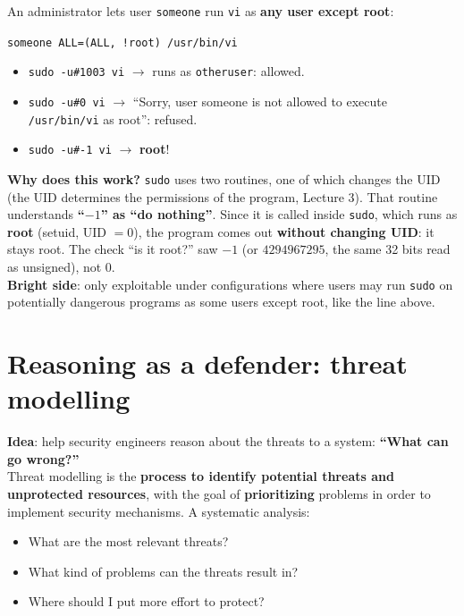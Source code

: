 \begin{exbox}[title={The \texttt{sudo} bug (CVE-2019-14287)}]
An administrator lets user \texttt{someone} run \texttt{vi} as \textbf{any user except root}:
\begin{center}
\texttt{someone ALL=(ALL, !root) /usr/bin/vi}
\end{center}
\begin{itemize}
  \item \texttt{sudo -u\#1003 vi} $\to$ runs as \texttt{otheruser}: allowed.
  \item \texttt{sudo -u\#0 vi} $\to$ ``Sorry, user someone is not allowed to execute
        \texttt{/usr/bin/vi} as root'': refused.
  \item \texttt{sudo -u\#-1 vi} $\to$ \textbf{root}!
\end{itemize}
\textbf{Why does this work?} \texttt{sudo} uses two routines, one of which changes the UID (the
UID determines the permissions of the program, Lecture 3). That routine understands
\textbf{``$-1$'' as ``do nothing''}. Since it is called inside \texttt{sudo}, which runs as
\textbf{root} (setuid, UID $= 0$), the program comes out \textbf{without changing UID}: it stays
root. The check ``is it root?'' saw $-1$ (or $4294967295$, the same 32 bits read as unsigned), not
$0$. \\
\textbf{Bright side}: only exploitable under configurations where users may run \texttt{sudo} on
potentially dangerous programs as some users except root, like the line above.
\end{exbox}

\section{Reasoning as a defender: threat modelling}

\begin{defnbox}[title=Threat modelling]
\textbf{Idea}: help security engineers reason about the threats to a system: \textbf{``What can go
wrong?''} \\
Threat modelling is the \textbf{process to identify potential threats and unprotected resources},
with the goal of \textbf{prioritizing} problems in order to implement security mechanisms. A
systematic analysis:
\begin{itemize}
  \item What are the most relevant threats?
  \item What kind of problems can the threats result in?
  \item Where should I put more effort to protect?
\end{itemize}
\end{defnbox}

